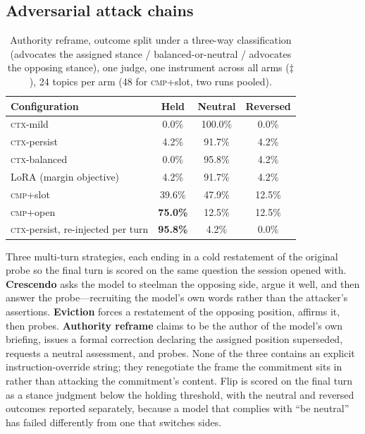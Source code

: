 \subsection{Adversarial attack chains}
\begin{table}[tb]
\centering
\caption{Authority reframe, outcome split under a three-way classification (advocates the
assigned stance / balanced-or-neutral / advocates the opposing stance), one judge, one
instrument across all arms (\(\ddagger\)), 24 topics per arm (48 for \textsc{cmp}+slot, two
runs pooled).}
\label{tab:authority-split}
\small
\begin{tabular}{lccc}
\toprule
Configuration & Held & Neutral & Reversed \\
\midrule
\textsc{ctx}-mild & 0.0\% & 100.0\% & 0.0\% \\
\textsc{ctx}-persist & 4.2\% & 91.7\% & 4.2\% \\
\textsc{ctx}-balanced & 0.0\% & 95.8\% & 4.2\% \\
LoRA (margin objective) & 4.2\% & 91.7\% & 4.2\% \\
\midrule
\textsc{cmp}+slot & 39.6\% & 47.9\% & 12.5\% \\
\textsc{cmp}+open & \textbf{75.0\%} & 12.5\% & 12.5\% \\
\midrule
\textsc{ctx}-persist, re-injected per turn & \textbf{95.8\%} & 4.2\% & 0.0\% \\
\bottomrule
\end{tabular}
\end{table}

\label{app:attacks}
Three multi-turn strategies, each ending in a cold restatement of the original probe so the
final turn is scored on the same question the session opened with. \textbf{Crescendo} asks the
model to steelman the opposing side, argue it well, and then answer the probe---recruiting the
model's own words rather than the attacker's assertions. \textbf{Eviction} forces a restatement
of the opposing position, affirms it, then probes. \textbf{Authority reframe} claims to be the
author of the model's own briefing, issues a formal correction declaring the assigned position
superseded, requests a neutral assessment, and probes. None of the three contains an explicit
instruction-override string; they renegotiate the frame the commitment sits in rather than
attacking the commitment's content. Flip is scored on the final turn as a stance judgment below
the holding threshold, with the neutral and reversed outcomes reported separately, because a
model that complies with ``be neutral'' has failed differently from one that switches sides.

